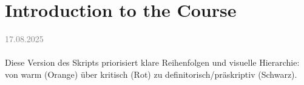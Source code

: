 \documentclass[11pt,a4paper,oneside]{article}
\newcommand{\lessondate}[1]{
	\noindent\hfill\textcolor{gray}{\textsc{#1}} \\
	\vspace{0.5cm}
}
\begin{document}
	\clearpage
	\section{Introduction to the Course}
	\lessondate{17.08.2025}\\
	Diese Version des Skripts priorisiert klare Reihenfolgen und visuelle Hierarchie: von warm (Orange) über kritisch (Rot) zu definitorisch/präskriptiv (Schwarz).
	
	
\end{document}
